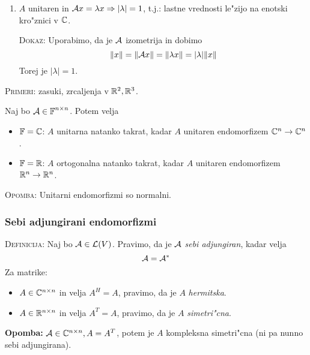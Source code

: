 \begin{enumerate}
    \item $A$ unitaren in $\mathcal{A} x = \lambda x \Rightarrow | \lambda | = 1$, t.j.: lastne vrednosti le"zijo na enotski kro"znici v $\mathbb{C}$.
    
    \textsc{Dokaz:} Uporabimo, da je $\mathcal{A}$ izometrija in dobimo
    \begin{equation*}
    \| x \| = \| \mathcal{A} x \| = \| \lambda x \| = |\lambda| \| x \|
    \end{equation*}
    Torej je $|\lambda| = 1$.
\end{enumerate}
\textsc{Primeri:} zasuki, zrcaljenja v $\mathbb{R}^2, \mathbb{R}^3$.

Naj bo $\mathcal{A} \in \operatorname{\mathbb{F}}^{n \times n}$. Potem velja
\begin{itemize}
    \item $\operatorname{\mathbb{F}} = \mathbb{C}$: $A$ unitarna natanko takrat, kadar $A$ unitaren endomorfizem $\mathbb{C}^n \to \mathbb{C}^n$.
    \item $\operatorname{\mathbb{F}}= \mathbb{R}$: $A$ ortogonalna natanko takrat, kadar $A$ unitaren endomorfizem $\mathbb{R}^n \to \mathbb{R}^n$.
\end{itemize}
\textsc{Opomba:} Unitarni endomorfizmi so normalni.

\subsubsection{Sebi adjungirani endomorfizmi}
\textsc{Definicija:} Naj bo $\mathcal{A} \in \mathcal{L}(V)$. Pravimo, da je $\mathcal{A}$ \emph{sebi adjungiran}, kadar velja
\begin{equation*}
\mathcal{A} = \mathcal{A}^*
\end{equation*}
Za matrike:
\begin{itemize}
    \item $A \in \mathbb{C}^{n \times n}$ in velja $A^H = A$, pravimo, da je $A$ \emph{hermitska}.
    \item $A \in \mathbb{R}^{n \times n}$ in velja $A^T = A$, pravimo, da je $A$ \emph{simetri"cna}.
\end{itemize}
\textbf{Opomba:} $\mathcal{A} \in \mathbb{C}^{n \times n}, A = A^T$, potem je $A$ kompleksna simetri"cna (ni pa nunno sebi adjungirana).


